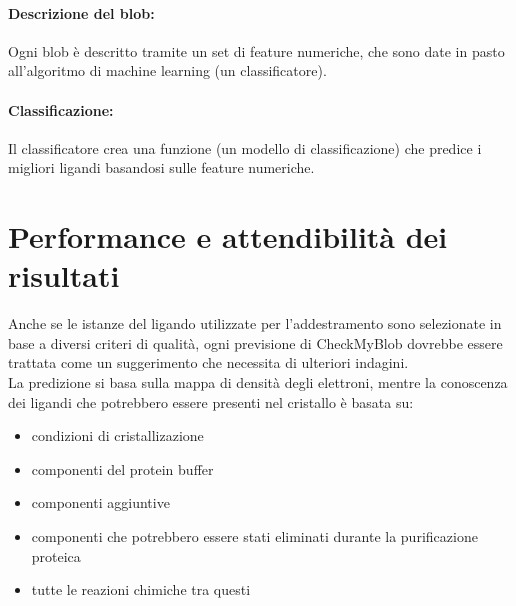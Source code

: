 \documentclass{article}
\begin{document}
\paragraph*{Descrizione del blob:} Ogni blob è descritto tramite un set di feature numeriche, che sono date in pasto all'algoritmo di machine learning (un classificatore). 
\paragraph*{Classificazione:} Il classificatore crea una funzione (un modello di classificazione) che predice i migliori ligandi basandosi sulle feature numeriche.

\section{Performance e attendibilità dei risultati}
Anche se le istanze del ligando utilizzate per l'addestramento sono selezionate in base a diversi criteri di qualità, ogni previsione di CheckMyBlob dovrebbe essere trattata come un suggerimento che necessita di ulteriori indagini.\\
La predizione si basa sulla mappa di densità degli elettroni, mentre la conoscenza dei ligandi che potrebbero essere presenti nel cristallo è basata su:
\begin{itemize}
  \item condizioni di cristallizazione
  \item componenti del protein buffer
  \item componenti aggiuntive
  \item componenti che potrebbero essere stati eliminati durante la purificazione proteica
  \item tutte le reazioni chimiche tra questi
\end{itemize}
\end{document}

